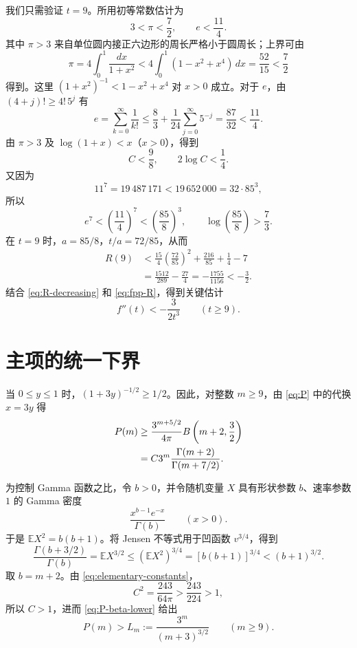 \documentclass[UTF8,fontset=fandol,11pt]{ctexart}
\newcommand{\E}{\mathbb{E}}
\begin{document}
我们只需验证 $t=9$。所用初等常数估计为
\begin{equation}\label{eq:elementary-constants}
3<\pi<\frac72,
\qquad
e<\frac{11}{4}.
\end{equation}
其中 $\pi>3$ 来自单位圆内接正六边形的周长严格小于圆周长；上界可由
\[
\pi=4\int_0^1\frac{dx}{1+x^2}
<4\int_0^1(1-x^2+x^4)\,dx
=\frac{52}{15}<\frac72
\]
得到。这里 $(1+x^2)^{-1}<1-x^2+x^4$ 对 $x>0$ 成立。对于 $e$，由 $(4+j)!\ge4!\,5^j$ 有
\[
e=\sum_{k=0}^\infty\frac1{k!}
\le\frac83+\frac1{24}\sum_{j=0}^\infty5^{-j}
=\frac{87}{32}<\frac{11}{4}.
\]
由 $\pi>3$ 及 $\log(1+x)<x$（$x>0$），得到
\begin{equation}\label{eq:C-log}
C<\frac98,
\qquad 2\log C<\frac14.
\end{equation}
又因为
\[
11^7=19\,487\,171
<19\,652\,000=32\cdot85^3,
\]
所以
\[
e^7<\left(\frac{11}{4}\right)^7
<\left(\frac{85}{8}\right)^3,
\qquad
\log\left(\frac{85}{8}\right)>\frac73.
\]
在 $t=9$ 时，$a=85/8$，$t/a=72/85$，从而
\begin{align*}
R(9)
&<\frac{15}{4}\left(\frac{72}{85}\right)^2
+\frac{216}{85}+\frac14-7\\
&=\frac{1512}{289}-\frac{27}{4}
=-\frac{1755}{1156}<-\frac32.
\end{align*}
结合 \eqref{eq:R-decreasing} 和 \eqref{eq:fpp-R}，得到关键估计
\begin{equation}\label{eq:fpp-negative}
\boxed{\displaystyle
f''(t)<-\frac3{2t^3}\qquad(t\ge9).}
\end{equation}

\section{主项的统一下界}

当 $0\le y\le1$ 时，$(1+3y)^{-1/2}\ge1/2$。因此，对整数 $m\ge9$，由 \eqref{eq:P} 中的代换 $x=3y$ 得
\begin{align}
P(m)
&\ge\frac{3^{m+5/2}}{4\pi}B\left(m+2,\frac32\right)\notag\\
&=C3^m\frac{\Gamma(m+2)}{\Gamma(m+7/2)}. \label{eq:P-beta-lower}
\end{align}

为控制 Gamma 函数之比，令 $b>0$，并令随机变量 $X$ 具有形状参数 $b$、速率参数 $1$ 的 Gamma 密度
\[
\frac{x^{b-1}e^{-x}}{\Gamma(b)}\qquad(x>0).
\]
于是 $\E X^2=b(b+1)$。将 Jensen 不等式用于凹函数 $v^{3/4}$，得到
\[
\frac{\Gamma(b+3/2)}{\Gamma(b)}
=\E X^{3/2}
\le(\E X^2)^{3/4}
=[b(b+1)]^{3/4}<(b+1)^{3/2}.
\]
取 $b=m+2$。由 \eqref{eq:elementary-constants}，
\[
C^2=\frac{243}{64\pi}>\frac{243}{224}>1,
\]
所以 $C>1$，进而 \eqref{eq:P-beta-lower} 给出
\begin{equation}\label{eq:P-lower}
\boxed{\displaystyle
P(m)>L_m:=\frac{3^m}{(m+3)^{3/2}}\qquad(m\ge9).}
\end{equation}
\end{document}
